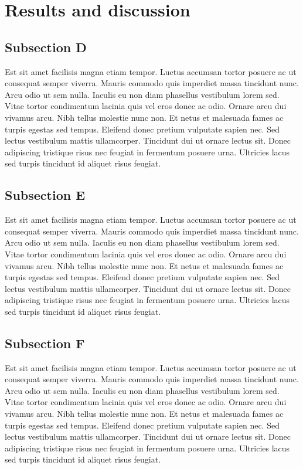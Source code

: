 \documentclass[11pt]{article}
\begin{document}
\section{Results and discussion} \label{sec:results}

\subsection{Subsection D} \label{sec:subd}

\par Est sit amet facilisis magna etiam tempor. Luctus accumsan tortor posuere ac ut consequat semper viverra. Mauris commodo quis imperdiet massa tincidunt nunc. Arcu odio ut sem nulla. Iaculis eu non diam phasellus vestibulum lorem sed. Vitae tortor condimentum lacinia quis vel eros donec ac odio. Ornare arcu dui vivamus arcu. Nibh tellus molestie nunc non. Et netus et malesuada fames ac turpis egestas sed tempus. Eleifend donec pretium vulputate sapien nec. Sed lectus vestibulum mattis ullamcorper. Tincidunt dui ut ornare lectus sit. Donec adipiscing tristique risus nec feugiat in fermentum posuere urna. Ultricies lacus sed turpis tincidunt id aliquet risus feugiat. 

\subsection{Subsection E} \label{sec:subd}

\par Est sit amet facilisis magna etiam tempor. Luctus accumsan tortor posuere ac ut consequat semper viverra. Mauris commodo quis imperdiet massa tincidunt nunc. Arcu odio ut sem nulla. Iaculis eu non diam phasellus vestibulum lorem sed. Vitae tortor condimentum lacinia quis vel eros donec ac odio. Ornare arcu dui vivamus arcu. Nibh tellus molestie nunc non. Et netus et malesuada fames ac turpis egestas sed tempus. Eleifend donec pretium vulputate sapien nec. Sed lectus vestibulum mattis ullamcorper. Tincidunt dui ut ornare lectus sit. Donec adipiscing tristique risus nec feugiat in fermentum posuere urna. Ultricies lacus sed turpis tincidunt id aliquet risus feugiat. 

\subsection{Subsection F} \label{sec:subd}

\par Est sit amet facilisis magna etiam tempor. Luctus accumsan tortor posuere ac ut consequat semper viverra. Mauris commodo quis imperdiet massa tincidunt nunc. Arcu odio ut sem nulla. Iaculis eu non diam phasellus vestibulum lorem sed. Vitae tortor condimentum lacinia quis vel eros donec ac odio. Ornare arcu dui vivamus arcu. Nibh tellus molestie nunc non. Et netus et malesuada fames ac turpis egestas sed tempus. Eleifend donec pretium vulputate sapien nec. Sed lectus vestibulum mattis ullamcorper. Tincidunt dui ut ornare lectus sit. Donec adipiscing tristique risus nec feugiat in fermentum posuere urna. Ultricies lacus sed turpis tincidunt id aliquet risus feugiat. 
\end{document}

